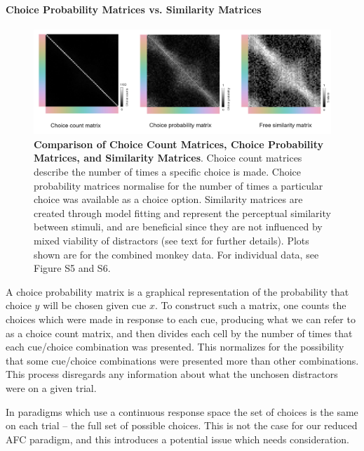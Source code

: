 \documentclass[9pt,biorxiv,lineno,onehalfspacing]{lapreprint}
\begin{document}
\begin{refsection}
\paragraph{Choice Probability Matrices vs. Similarity Matrices}

\begin{figure}
    \begin{fullwidth}
    \centering
      \includegraphics[width=\textwidth+4cm]{Outputs/Paper/Figures/flat/F7_choiceProbVsSim.png}
           \caption{\textbf{Comparison of Choice Count Matrices, Choice Probability Matrices, and Similarity Matrices}.
           Choice count matrices describe the number of times a specific choice is made. 
           Choice probability matrices normalise for the number of times a particular choice was available as a choice option. 
           Similarity matrices are created through model fitting and represent the perceptual similarity between stimuli, and are beneficial since they are not influenced by mixed viability of distractors (see text for further details).
           Plots shown are for the combined monkey data. For individual data, see Figure S5 and S6.}
		\label{fig:choiceProbVsSim}
    \end{fullwidth}
\end{figure}

A choice probability matrix is a graphical representation of the probability that choice $y$ will be chosen given cue $x$.
To construct such a matrix, one counts the choices which were made in response to each cue, producing what we can refer to as a choice count matrix, and then divides each cell by the number of times that each cue/choice combination was presented. 
This normalizes for the possibility that some cue/choice combinations were presented more than other combinations. 
This process disregards any information about what the unchosen distractors were on a given trial.

In paradigms which use a continuous response space the set of choices is the same on each trial – the full set of possible choices. 
This is not the case for our reduced AFC paradigm, and this introduces a potential issue which needs consideration.


\end{refsection}
\end{document}

